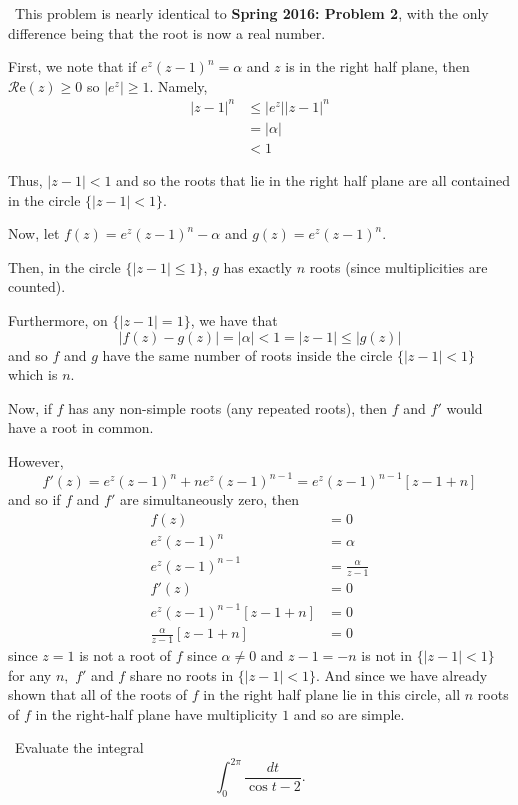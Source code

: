 \documentclass[12pt]{Homework}
\newcommand{\re}{\mathscr{R}\text{e}}
\begin{document}
\begin{solution}$\,$
This problem is nearly identical to \textbf{Spring 2016: Problem 2}, with the only difference being that the root is now a real number.

First, we note that if $e^z(z-1)^n=\alpha$ and $z$ is in the right half plane, then $\re(z)\ge0$ so $|e^z|\ge1$. Namely, \begin{align*}
    |z-1|^n&\le|e^z||z-1|^n\\
    &=|\alpha|\\
    &<1
\end{align*}

Thus, $|z-1|<1$ and so the roots that lie in the right half plane are all contained in the circle $\{|z-1|<1\}.$

Now, let $f(z)=e^z(z-1)^n-\alpha$ and $g(z)=e^z(z-1)^n$.

Then, in the circle $\{|z-1|\le 1\}$, $g$ has exactly $n$ roots (since multiplicities are counted).

Furthermore, on $\{|z-1|=1\}$, we have that $$|f(z)-g(z)|=|\alpha|<1=|z-1|\le|g(z)|$$ and so $f$ and $g$ have the same number of roots inside the circle $\{|z-1|<1\}$ which is $n.$

Now, if $f$ has any non-simple roots (any repeated roots), then $f$ and $f'$ would have a root in common. 

However, $$f'(z)=e^z(z-1)^n+ne^z(z-1)^{n-1}=e^z(z-1)^{n-1}[z-1+n]$$ and so if $f$ and $f'$ are simultaneously zero, then \begin{align*}
    f(z)&=0\\
    e^z(z-1)^n&=\alpha\\
    e^z(z-1)^{n-1}&=\frac{\alpha}{z-1}\\
    f'(z)&=0\\
    e^z(z-1)^{n-1}[z-1+n]&=0\\
    \frac{\alpha}{z-1}[z-1+n]&=0
\end{align*} since $z=1$ is not a root of $f$ since $\alpha\not=0$ and $z-1=-n$ is not in $\{|z-1|<1\}$ for any $n,$ $f'$ and $f$ share no roots in $\{|z-1|<1\}$. And since we have already shown that all of the roots of $f$ in the right half plane lie in this circle, all $n$ roots of $f$ in the right-half plane have multiplicity $1$ and so are simple.
\end{solution}
\newpage




\begin{problem} $\,$
Evaluate the integral $$\int_0^{2\pi}\frac{dt}{\cos t-2}.$$
\end{problem}
\end{document}
